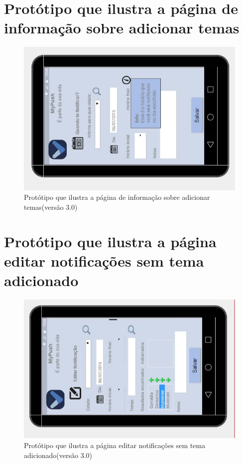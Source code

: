 \begin{apendicesenv}
    \pagebreak
      \section*{Protótipo que ilustra a página de informação sobre adicionar temas}

    \begin{figure}[!htbp]
      \centering
      \includegraphics[scale=0.9, angle=-90]{editaveis/figuras/prototipo_alta_fidelidade_v3/3_13}
      \caption{Protótipo que ilustra a página de informação sobre adicionar temas(versão 3.0)}
      \label{v3}
    \end{figure}
    
    \pagebreak
      \section*{Protótipo que ilustra a página editar notificações sem tema adicionado}

    \begin{figure}[!htbp]
      \centering
      \includegraphics[scale=0.9, angle=-90]{editaveis/figuras/prototipo_alta_fidelidade_v3/3_14}
      \caption{Protótipo que ilustra a página editar notificações sem tema adicionado(versão 3.0)}
      \label{v3}
    \end{figure}
    

\end{apendicesenv}

